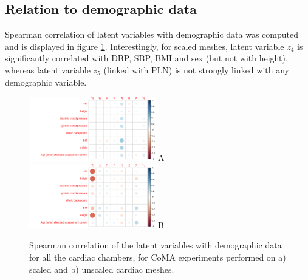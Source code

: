 
\subsection*{Relation to demographic data}
Spearman correlation of latent variables with demographic data was computed and is displayed in figure \ref{fig:relation_to_demographic}.
Interestingly, for scaled meshes, latent variable $z_4$ is significantly correlated with DBP, SBP, BMI and sex (but not with height), whereas latent variable $z_5$ (linked with PLN) is not strongly linked with any demographic variable.

\begin{figure}[ht!]
\includegraphics[width=0.5\textwidth]{figs/correlation/experiment_1_vs_demographic_data}A
\includegraphics[width=0.5\textwidth]{figs/correlation/experiment_2_vs_demographic_data}B
\label{fig:relation_to_demographic}
\caption{Spearman correlation of the latent variables with demographic data for all the cardiac chambers, for CoMA experiments performed on a) scaled and b) unscaled cardiac meshes.}
\end{figure}

